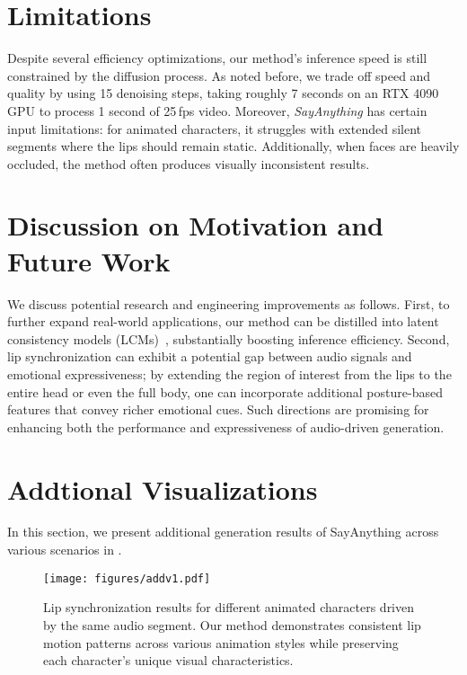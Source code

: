 \section{Limitations}

Despite several efficiency optimizations, our method's inference speed is still constrained by the diffusion process. As noted before, we trade off speed and quality by using 15 denoising steps, taking roughly 7 seconds on an RTX 4090 GPU to process 1 second of 25\,fps video. Moreover, \emph{SayAnything} has certain input limitations: for animated characters, it struggles with extended silent segments where the lips should remain static. Additionally, when faces are heavily occluded, the method often produces visually inconsistent results.

\section{Discussion on Motivation and Future Work}

We discuss potential research and engineering improvements as follows.
First, to further expand real-world applications, our method can be distilled into latent consistency models (LCMs)~\citep{luo2023latent}, substantially boosting inference efficiency.
Second, lip synchronization can exhibit a potential gap between audio signals and emotional expressiveness; by extending the region of interest from the lips to the entire head or even the full body, one can incorporate additional posture-based features that convey richer emotional cues.
Such directions are promising for enhancing both the performance and expressiveness of audio-driven generation.

\section{Addtional Visualizations}

In this section, we present additional generation results of SayAnything across various scenarios in .

\begin{figure*}[!ht]
    \centering
    \texttt{[image: figures/addv1.pdf]}
    \caption{Lip synchronization results for different animated characters driven by the same audio segment. Our method demonstrates consistent lip motion patterns across various animation styles while preserving each character's unique visual characteristics.}
    \label{fig:add1}
\end{figure*}










